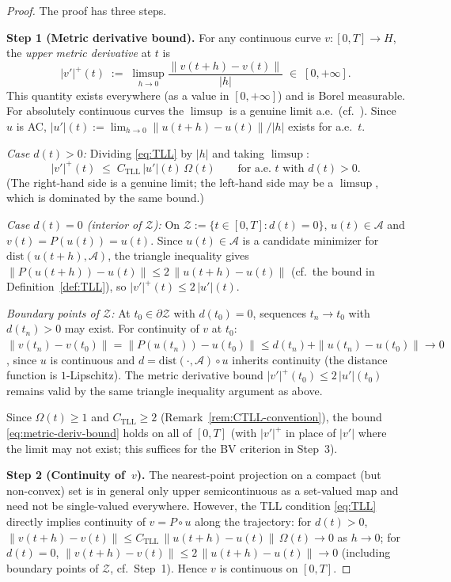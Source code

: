 \documentclass[12pt,a4paper]{article}
\theoremstyle{definition}
\theoremstyle{plain}
\theoremstyle{remark}
\newcommand{\dist}{\mathrm{dist}}
\begin{document}
\begin{proof}
The proof has three steps.

\medskip
\noindent
\textbf{Step 1 (Metric derivative bound).}\;
For any continuous curve $v: [0,T] \to H$, the \emph{upper
metric derivative} at $t$ is
\[
  |v'|^+(t)
  \;:=\;
  \limsup_{h \to 0} \frac{\|v(t+h) - v(t)\|}{|h|}
  \;\in\; [0,+\infty].
\]
This quantity exists everywhere (as a value in $[0,+\infty]$)
and is Borel measurable.  For absolutely continuous curves the
$\limsup$ is a genuine limit a.e.\
(cf.~\cite[Theorem~1.1.2]{AmbrosioGigliSavare2008}).
Since $u$ is AC, $|u'|(t) := \lim_{h\to 0}\|u(t+h)-u(t)\|/|h|$
exists for a.e.~$t$.

\smallskip\noindent
\emph{Case $d(t)>0$:}\;
Dividing \eqref{eq:TLL} by $|h|$ and taking $\limsup$:
\begin{equation}\label{eq:metric-deriv-bound}
  |v'|^+(t)
  \;\le\;
  C_{\mathrm{TLL}}\,|u'|(t)\,\Omega(t)
  \qquad \text{for a.e.\ } t \text{ with } d(t) > 0.
\end{equation}
(The right-hand side is a genuine limit; the left-hand side
may be a $\limsup$, which is dominated by the same bound.)

\smallskip\noindent
\emph{Case $d(t)=0$ (interior of $\mathcal{Z}$):}\;
On $\mathcal{Z} := \{t \in [0,T] : d(t) = 0\}$,
$u(t) \in \mathcal{A}$ and $v(t) = P(u(t)) = u(t)$.
Since $u(t) \in \mathcal{A}$ is a candidate minimizer for
$\dist(u(t+h), \mathcal{A})$, the triangle inequality gives
$\|P(u(t+h)) - u(t)\| \le 2\,\|u(t+h) - u(t)\|$
(cf.\ the bound in Definition~\ref{def:TLL}),
so $|v'|^+(t) \le 2\,|u'|(t)$.

\smallskip\noindent
\emph{Boundary points of $\mathcal{Z}$:}\;
At $t_0 \in \partial\mathcal{Z}$ with $d(t_0)=0$, sequences
$t_n \to t_0$ with $d(t_n) > 0$ may exist.  For continuity of
$v$ at $t_0$: $\|v(t_n) - v(t_0)\| = \|P(u(t_n)) - u(t_0)\|
\le d(t_n) + \|u(t_n) - u(t_0)\| \to 0$, since $u$ is
continuous and $d = \dist(\cdot,\mathcal{A}) \circ u$ inherits
continuity (the distance function is $1$-Lipschitz).  The metric derivative bound
$|v'|^+(t_0) \le 2\,|u'|(t_0)$ remains valid by the same
triangle inequality argument as above.

\smallskip\noindent
Since $\Omega(t) \ge 1$ and $C_{\mathrm{TLL}} \ge 2$
(Remark~\ref{rem:CTLL-convention}), the
bound \eqref{eq:metric-deriv-bound} holds on all of $[0,T]$
(with $|v'|^+$ in place of $|v'|$ where the limit may not
exist; this suffices for the BV criterion in Step~3).

\medskip
\noindent
\textbf{Step 2 (Continuity of~$v$).}\;
The nearest-point projection on a compact (but non-convex) set
is in general only upper semicontinuous as a set-valued map
and need not be single-valued everywhere.  However, the
TLL condition \eqref{eq:TLL} directly implies continuity
of $v = P \circ u$ along the trajectory: for $d(t) > 0$,
$\|v(t+h) - v(t)\| \le C_{\mathrm{TLL}}\,\|u(t+h)-u(t)\|\,
\Omega(t) \to 0$ as $h \to 0$; for $d(t) = 0$,
$\|v(t+h)-v(t)\| \le 2\,\|u(t+h)-u(t)\| \to 0$
(including boundary points of $\mathcal{Z}$, cf.\ Step~1).
Hence $v$ is continuous on $[0,T]$.


\end{proof}
\end{document}
